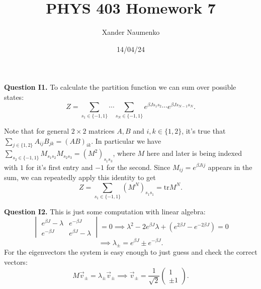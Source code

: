 \documentclass[letterpaper, reqno,11pt]{article}
\begin{document}
\title{PHYS 403 Homework 7}
\date{14/04/24}
\author{Xander Naumenko}
\maketitle

{\medskip\noindent\bf Question I1.} To calculate the partition function we can sum over possible states:
\[
Z=\sum_{s_1\in \{-1,1\}}\cdots \sum_{s_N\in \{-1,1\}}e^{\beta Js_1s_2}\cdots e^{\beta Js_{N-1}s_N}
.\]

Note that for general $2\times 2$ matrices $A,B$ and $i,k\in \{1,2\}$, it's true that $\sum_{j\in \{1,2\}}A_{ij}B_{jk}=(AB)_{ik}$. In particular we have $\sum_{s_2\in \{-1,1\}}M_{s_1s_2}M_{s_2s_3}=\left( M^2 \right)_{s_1s_3}$, where $M$ here and later is being indexed with $1$ for it's first entry and $-1$ for the second. Since $M_{ij}=e^{\beta Jij}$ appears in the sum, we can repeatedly apply this identity to get
\[
Z=\sum_{s_1\in \{-1,1\}}(M^{N})_{s_1s_1}=\text{tr} M^{N}
.\]

{\medskip\noindent\bf Question I2.} This is just some computation with linear algebra:
\[
    \begin{vmatrix} e^{\beta J}-\lambda&e^{-\beta J}\\e^{-\beta J}&e^{\beta J}-\lambda \end{vmatrix} =0\implies \lambda^2-2e^{\beta J}\lambda+\left( e^{2\beta J}-e^{-2\beta J} \right)=0
\]
\[
\implies \lambda_{\pm} = e^{\beta J}\pm e^{-\beta J}
.\]
For the eigenvectors the system is easy enough to just guess and check the correct vectors:
\[
M \vec v_{\pm}=\lambda_{\pm} \vec v_{\pm}\implies \vec v_{\pm}= \frac{1}{\sqrt{2}}\begin{pmatrix} 1\\ \pm 1 \end{pmatrix} 
.\]
\end{document}
